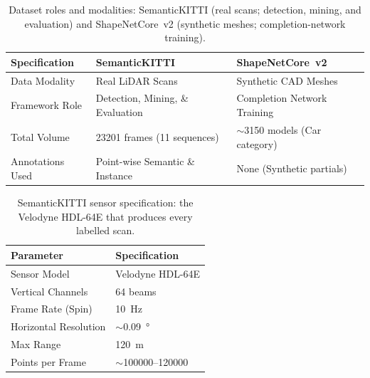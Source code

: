 \documentclass[a4paper,12pt]{report}
\begin{document}
\begin{table}[H]
  \centering
  \caption[Dataset roles and modalities]{Dataset roles and modalities: SemanticKITTI (real
    scans; detection, mining, and evaluation) and ShapeNetCore~v2 (synthetic meshes;
    completion-network training).}
  \label{tab:dataset-roles}
  \begin{tabular}{@{}l p{5.2cm} p{5.2cm}@{}}
    \toprule
    Specification & SemanticKITTI & ShapeNetCore~v2 \\
    \midrule
    Data Modality     & Real LiDAR Scans                  & Synthetic CAD Meshes \\
    Framework Role     & Detection, Mining, \& Evaluation  & Completion Network Training \\
    Total Volume       & \num{23201} frames (\num{11} sequences) & $\sim$\num{3150} models (Car category) \\
    Annotations Used   & Point-wise Semantic \& Instance   & None (Synthetic partials) \\
    \bottomrule
  \end{tabular}
\end{table}

\begin{table}[H]
  \centering
  \caption[SemanticKITTI sensor specification]{SemanticKITTI sensor specification: the
    Velodyne HDL-64E that produces every labelled scan.}
  \label{tab:sensor-spec}
  \begin{tabular}{@{}ll@{}}
    \toprule
    Parameter & Specification \\
    \midrule
    Sensor Model          & Velodyne HDL-64E \\
    Vertical Channels     & \num{64} beams \\
    Frame Rate (Spin)     & \SI{10}{\hertz} \\
    Horizontal Resolution & $\sim$\SI{0.09}{\degree} \\
    Max Range             & \SI{120}{\meter} \\
    Points per Frame      & $\sim$\numrange{100000}{120000} \\
    \bottomrule
  \end{tabular}
\end{table}
\end{document}
